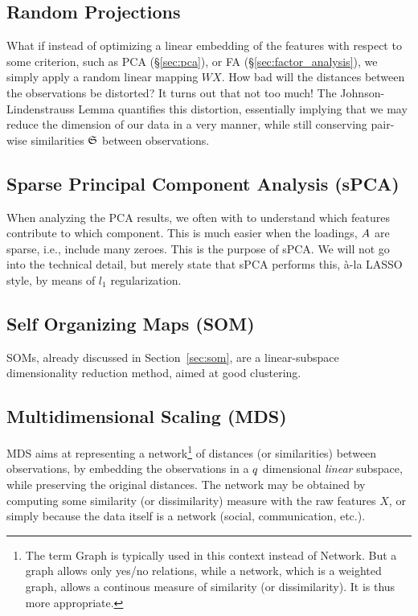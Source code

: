 \subsection{Random Projections}
\label{sec:random_projections}

What if instead of optimizing a linear embedding of the features with respect to some criterion, such as PCA (\S\ref{sec:pca}), or FA (\S\ref{sec:factor_analysis}), we simply apply a random linear mapping $W X$. How bad will the distances between the observations be distorted? 
It turns out that not too much!
The Johnson-Lindenstrauss Lemma \citep{johnson_extensions_1984} quantifies this distortion, essentially implying that we may reduce the dimension of our data in a very \naive manner, while still conserving pair-wise similarities $\mathfrak{S}$ between observations.
 




\subsection{Sparse Principal Component Analysis (sPCA)}
\label{sec:spca}

When analyzing the PCA results, we often with to understand which features contribute to which component. 
This is much easier when the loadings, $A$ are sparse, i.e., include many zeroes. 
This is the purpose of sPCA. 
We will not go into the technical detail, but merely state that sPCA performs this, \`a-la LASSO style, by means of $l_1$ regularization.







\subsection{Self Organizing Maps (SOM)}
SOMs, already discussed in Section~\ref{sec:som}, are a linear-subspace dimensionality reduction method, aimed at good clustering. 


\subsection{Multidimensional Scaling (MDS)}
\label{sec:mds}

MDS aims at representing a network\footnote{The term Graph is typically used in this context instead of Network. But a graph allows only yes/no relations, while a network, which is a weighted graph, allows a continous measure of similarity (or dissimilarity). It is thus more appropriate.} of distances (or similarities) between observations, by embedding the observations in a $q$ dimensional \emph{linear} subspace, while preserving the original distances.
The network may be obtained by computing some similarity (or dissimilarity) measure with the raw features $X$, or simply because the data itself is a network (social, communication, etc.).

